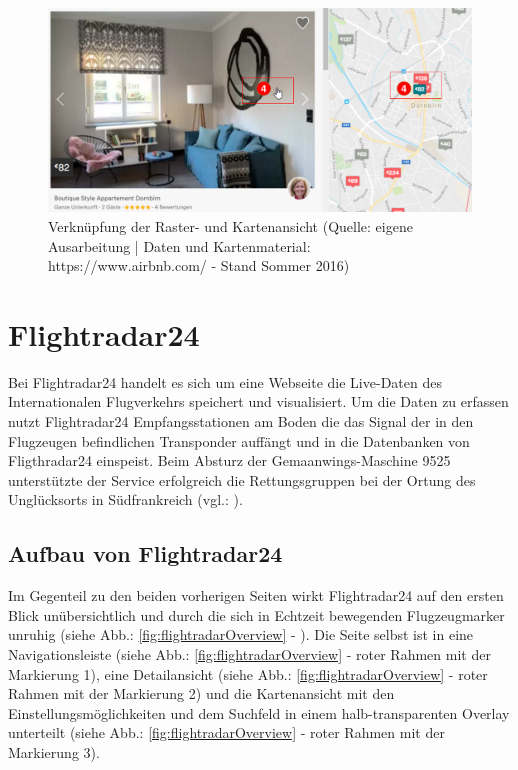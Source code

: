 \documentclass[../Bachelorarbeit.tex]{subfiles}
\begin{document}
\begin{figure}[H]
\centering
\includegraphics[width=1\linewidth]{img/StandDerTechnik/airbnbDetail}
\caption[Verknüpfung der Raster- und Kartenansicht]{Verknüpfung der Raster- und Kartenansicht (Quelle: eigene Ausarbeitung | Daten und Kartenmaterial: https://www.airbnb.com/ - Stand Sommer 2016)}
\label{fig:airbnbDetail}
\end{figure}




\section{Flightradar24}
\label{Flightradar}
Bei Flightradar24 handelt es sich um eine Webseite die Live-Daten des Internationalen Flugverkehrs speichert und visualisiert. 
Um die Daten zu erfassen nutzt Flightradar24 Empfangsstationen am Boden die das Signal der in den Flugzeugen befindlichen Transponder auffängt und in die Datenbanken von Fligthradar24 einspeist. 
Beim Absturz der Gemaanwings-Maschine 9525 unterstützte der Service erfolgreich die Rettungsgruppen bei der Ortung des Unglücksorts in Südfrankreich (vgl.: \cite{SiebeckFlightradar}).


\subsection{Aufbau von Flightradar24}
\label{flightradarAufbau}
Im Gegenteil zu den beiden vorherigen Seiten wirkt Flightradar24 auf den ersten Blick unübersichtlich und durch die sich in Echtzeit bewegenden Flugzeugmarker unruhig (siehe Abb.: \ref{fig:flightradarOverview} - ).
Die Seite selbst ist in eine Navigationsleiste (siehe Abb.: \ref{fig:flightradarOverview} - roter Rahmen mit der Markierung 1), eine Detailansicht (siehe Abb.: \ref{fig:flightradarOverview} - roter Rahmen mit der Markierung 2) und die Kartenansicht mit den Einstellungsmöglichkeiten und dem Suchfeld in einem halb-transparenten Overlay unterteilt (siehe Abb.: \ref{fig:flightradarOverview} - roter Rahmen mit der Markierung 3). 
\end{document}
